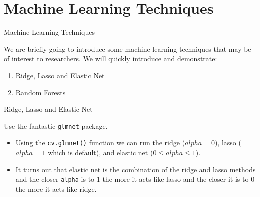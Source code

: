 \section{Machine Learning Techniques}\label{machine-learning-techniques}

\begin{frame}{Machine Learning Techniques}

We are briefly going to introduce some machine learning techniques that
may be of interest to researchers. We will quickly introduce and
demonstrate:

\begin{enumerate}
\def\labelenumi{\arabic{enumi}.}
\tightlist
\item
  Ridge, Lasso and Elastic Net
\item
  Random Forests
\end{enumerate}

\end{frame}

\begin{frame}[fragile]{Ridge, Lasso and Elastic Net}

Use the fantastic \texttt{glmnet} package.

\begin{itemize}
\tightlist
\item
  Using the \texttt{cv.glmnet()} function we can run the ridge
  (\(alpha = 0\)), lasso (\(alpha = 1\) which is default), and elastic
  net (\(0 \leq alpha \leq 1\)).
\item
  It turns out that elastic net is the combination of the ridge and
  lasso methods and the closer \texttt{alpha} is to 1 the more it acts
  like lasso and the closer it is to 0 the more it acts like ridge.
\end{itemize}

\end{frame}

